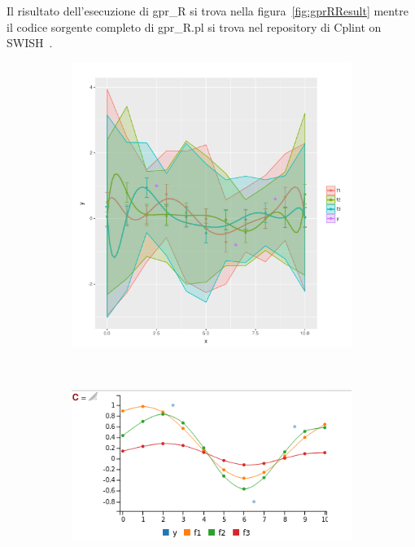 \documentclass[10pt,titlepage,twoside,a4paper]{report}
\begin{document}
Il risultato dell'esecuzione di gpr\_R si trova nella 
figura~\ref{fig:gprRResult} mentre il codice sorgente completo di gpr\_R.pl si 
trova nel repository di Cplint on SWISH~\cite{gprRpl}.

\begin{minipage}{\textwidth}
\centering
\begin{figure}[H]
\caption{Risultato di \texttt{draw\_fun\_pred(sq\_exp\_p)} di gpr.pl}
\label{fig:gprRResult}
    \begin{subfigure}[b]{0.5\textwidth}
        \includegraphics[width=1.0\linewidth]{gpr_R_plot.png}
    \end{subfigure}~\begin{subfigure}[b]{0.5\textwidth}
        \includegraphics[width=1.0\linewidth]{gpr_plot.png}
    \end{subfigure}
\end{figure}
\end{minipage}
\end{document}
